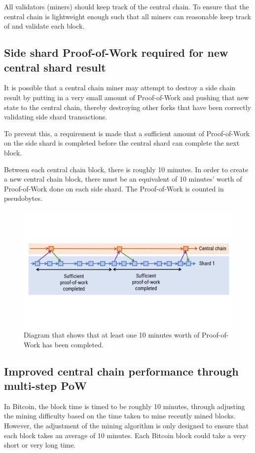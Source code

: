 \documentclass[a4paper,12pt]{article}
\begin{document}
All validators (miners) should keep track of the central chain. To ensure that the central chain is lightweight enough such that all miners can reasonable keep track of and validate each block.

\subsection{Side shard Proof-of-Work required for new central shard result}
It is possible that a central chain miner may attempt to destroy a side chain result by putting in a very small amount of Proof-of-Work and pushing that new state to the central chain, thereby destroying other forks that have been correctly validating side shard transactions.

To prevent this, a requirement is made that a sufficient amount of Proof-of-Work on the side shard is completed before the central shard can complete the next block. 



Between each central chain block, there is roughly 10 minutes. In order to create a new central chain block, there must be an equivalent of 10 minutes' worth of Proof-of-Work done on each side shard. The Proof-of-Work is counted in pseudobytes. 

\begin{figure}[!htb]
  \centering
  \includegraphics[page=1,width=.95\textwidth]{side-shard-Proof-of-Work} 
  \caption{Diagram that shows that at least one 10 minutes worth of Proof-of-Work has been completed.}
  \label{fig:side-shard-Proof-of-Work}
\end{figure}
\FloatBarrier



\subsection{Improved central chain performance through multi-step PoW}
In Bitcoin, the block time is timed to be roughly 10 minutes, through adjusting the mining difficulty based on the time taken to mine recently mined blocks. However, the adjustment of the mining algorithm is only designed to ensure that each block takes an average of 10 minutes. Each Bitcoin block could take a very short or very long time.
\end{document}
